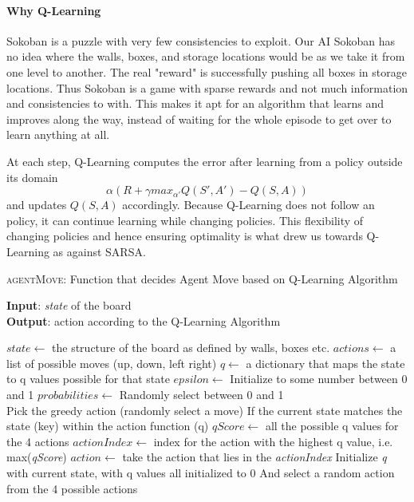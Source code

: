 \documentclass{article}
\begin{document}
\paragraph{Why Q-Learning}
Sokoban is a puzzle with very few consistencies to exploit. Our AI Sokoban has no idea where the walls, boxes, and storage locations would be as we take it from one level to another. The real "reward" is successfully pushing all boxes in storage locations. Thus Sokoban is a game with sparse rewards and not much information and consistencies to with. This makes it apt for an algorithm that learns and improves along the way, instead of waiting for the whole episode to get over to learn anything at all.

At each step, Q-Learning computes the error after learning from a policy outside its domain $$\alpha(R + \gamma max_{\alpha'}Q(S',A') - Q(S,A))$$ 
and updates $Q(S,A)$ accordingly. Because Q-Learning does not follow an policy, it can continue learning while changing policies. This flexibility of changing policies and hence ensuring optimality is what drew us towards Q-Learning as against SARSA. 

\begin{algorithm}
    \caption{\textsc{agentMove}: Function that decides Agent Move based on Q-Learning Algorithm}\label{euclid}
    \hspace*{\algorithmicindent} \textbf{Input}: \emph{state} of the board \\
    \hspace*{\algorithmicindent} \textbf{Output}: action according to the Q-Learning  Algorithm \\
    \begin{algorithmic}
    \State $state \gets$ the structure of the board as defined by walls, boxes etc.
    \State $actions \gets$ a list of possible moves (up, down, left right)
    \State $q \gets$ a dictionary that maps the state to q values possible for that state
    \State $epsilon \gets$ Initialize to some number between 0 and 1
    \State $probabilities \gets$ Randomly select between 0 and 1 \\
        \State Pick the greedy action (randomly select a move)
    \Else
        \If If the current state matches the state (key) within the action function (q) %
            \State $qScore \gets$ all the possible q values for the 4 actions
            \State $actionIndex \gets$ index for the action with the highest q value, i.e. max(\emph{qScore})
            \State $action \gets$ take the action that lies in the \emph{actionIndex}
        \Else
            \State Initialize \emph{q} with current state, with q values all initialized to 0
            \State And select a random action from the 4 possible actions
        \EndIf
    \EndIf 
    \end{algorithmic}
\end{algorithm}
\end{document}
